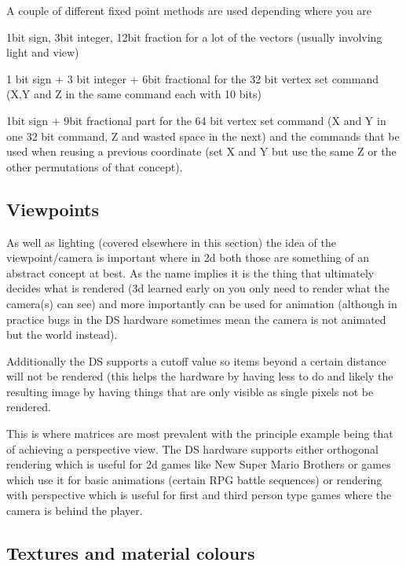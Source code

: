 \documentclass[
]{book}
\begin{document}
A couple of different fixed point methods are used depending where you are

1bit sign, 3bit integer, 12bit fraction for a lot of the vectors (usually involving light and view)

1 bit sign + 3 bit integer + 6bit fractional for the 32 bit vertex set command (X,Y and Z in the same command each with 10 bits)

1bit sign + 9bit fractional part for the 64 bit vertex set command (X and Y in one 32 bit command, Z and wasted space in the next) and the commands that be used when reusing a previous coordinate (set X and Y but use the same Z or the other permutations of that concept).

\hypertarget{viewpoints}{%
\subsection{Viewpoints}\label{viewpoints}}

As well as lighting (covered elsewhere in this section) the idea of the viewpoint/camera is important where in 2d both those are something of an abstract concept at best. As the name implies it is the thing that ultimately decides what is rendered (3d learned early on you only need to render what the camera(s) can see) and more importantly can be used for animation (although in practice bugs in the DS hardware sometimes mean the camera is not animated but the world instead).

Additionally the DS supports a cutoff value so items beyond a certain distance will not be rendered (this helps the hardware by having less to do and likely the resulting image by having things that are only visible as single pixels not be rendered.

This is where matrices are most prevalent with the principle example being that of achieving a perspective view. The DS hardware supports either orthogonal rendering which is useful for 2d games like New Super Mario Brothers or games which use it for basic animations (certain RPG battle sequences) or rendering with perspective which is useful for first and third person type games where the camera is behind the player.

\hypertarget{textures-and-material-colours}{%
\subsection{Textures and material colours}\label{textures-and-material-colours}}
\end{document}
